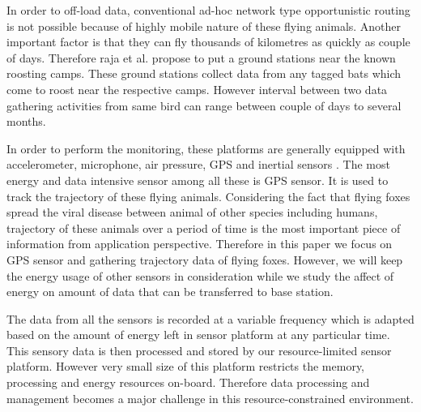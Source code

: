 \documentclass[conference]{IEEEtran}
\begin{document}
In order to off-load data, conventional ad-hoc network type opportunistic routing is not possible because of highly mobile nature of these flying animals. Another important factor is that they can fly thousands of kilometres as quickly as couple of days. Therefore raja et al.\cite{raja-ipsn} propose to put a ground stations near the known roosting camps. These ground stations collect data from any tagged bats which come to roost near the respective camps. However interval between two data gathering activities from same bird can range between couple of days to several months. \ %

In order to perform the monitoring, these platforms are generally equipped with accelerometer, microphone, air pressure, GPS and inertial sensors \cite{raja-ipsn}. The most energy and data intensive sensor among all these is GPS sensor. It is used to track the trajectory of these flying animals. Considering the fact that flying foxes spread the viral disease between animal of other species including humans, trajectory of these animals over a period of time is the most important piece of information from application perspective. Therefore in this paper we focus on GPS sensor and gathering trajectory data of flying foxes. However, we will keep the energy usage of other sensors in consideration while we study the affect of energy on amount of data that can be transferred to base station.\

 The data from all the sensors is recorded at a variable frequency which is adapted based on the amount of energy left in sensor platform at any particular time. This sensory data is then processed and stored by our resource-limited sensor platform. However very small size of this platform restricts the memory, processing and energy resources on-board. Therefore data processing and management becomes a major challenge in this resource-constrained environment. 
\end{document}
